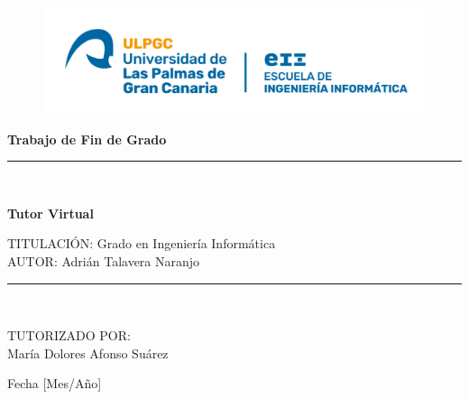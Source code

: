 \begin{titlepage}

\begin{center}

\vspace*{0.25in}
\begin{figure}[htb]
\begin{center}
\includegraphics[width=15cm]{Ilustraciones/NuevoLogoEII.png}
\end{center}
\end{figure}

\vspace*{0.25in}
\vspace*{0.25in}
\begin{Huge}
    \textbf{Trabajo de Fin de Grado} \\
\end{Huge}
\vspace*{0.5in}

\noindent\hfil\rule{17cm}{0.2mm}\hfil\\

\vspace*{0.1in}
\begin{Huge}
    \textbf{Tutor Virtual} \\
\end{Huge}
\vspace*{0.3in}
\begin{large}
TITULACIÓN: Grado en Ingeniería Informática \\
\vspace*{0.1in}
AUTOR: Adrián Talavera Naranjo \\
\end{large}
\vspace*{0.3in}
\noindent\hfil\rule{17cm}{0.2mm}\hfil\\
\vspace*{0.1in}
\begin{large}
TUTORIZADO POR: \\
María Dolores Afonso Suárez \\
\end{large}
\vspace*{0.3in}
Fecha [Mes/Año]

\end{center}


\end{titlepage}